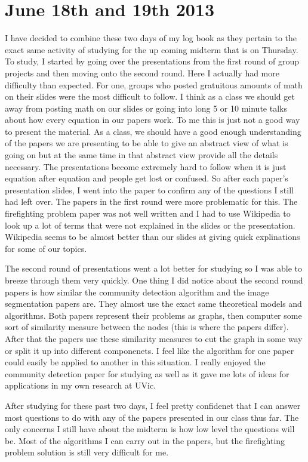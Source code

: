 \documentclass[conference]{IEEEtran}
\begin{document}
\section{June 18th and 19th 2013}
I have decided to combine these two days of my log book as they pertain to the exact same activity of
studying for the up coming midterm that is on Thursday. To study, I started by going over the presentations
from the first round of group projects and then moving onto the second round. Here I actually had more
difficulty than expected. For one, groups who posted gratuitous amounts of math on their slides were
the most difficult to follow. I think as a class we should get away from posting math on our slides
or going into long 5 or 10 minute talks about how every equation in our papers work. To me this is just
not a good way to present the material. As a class, we should have a good enough understanding of the
papers we are presenting to be able to give an abstract view of what is going on but at the same time
in that abstract view provide all the details necessary. The presentations become extremely hard to follow
when it is just equation after equation and people get lost or confused. So after each paper's presentation
slides, I went into the paper to confirm any of the questions I still had left over. The papers in the
first round were more problematic for this. The firefighting problem paper was not well written and I
had to use Wikipedia to look up a lot of terms that were not explained in the slides or the presentation.
Wikipedia seems to be almost better than our slides at giving quick explinations for some of our topics.

The second round of presentations went a lot better for studying so I was able to breeze through them
very quickly. One thing I did notice about the second round papers is how similar the community 
detection algorithm and the image segmentation papers are. They almost use the exact same theoretical models
and algorithms. Both papers represent their problems as graphs, then computer some sort of similarity 
measure between the nodes (this is where the papers differ). After that the papers use these similarity
measures to cut the graph in some way or split it up into different componenets. I feel like the algorithm
for one paper could easily be applied to another in this situation. I really enjoyed the community 
detection paper for studying as well as it gave me lots of ideas for applications in my own research at
UVic.

After studying for these past two days, I feel pretty confidenet that I can answer most questions to
do with any of the papers presented in our class thus far. The only concerns I still have about the
midterm is how low level the questions will be. Most of the algorithms I can carry out in the papers,
but the firefighting problem solution is still very difficult for me.
\end{document}
